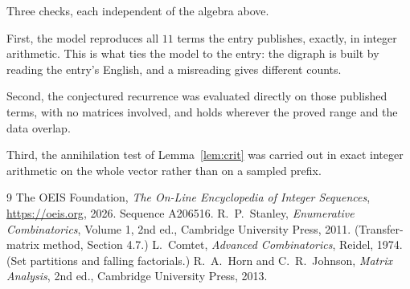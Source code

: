 \documentclass[11pt,a4paper]{article}
\theoremstyle{plain}
\theoremstyle{definition}
\begin{document}
Three checks, each independent of the algebra above.

First, the model reproduces all $11$ terms the entry publishes, exactly, in integer
arithmetic. This is what ties the model to the entry: the digraph is built by reading the
entry's English, and a misreading gives different counts.

Second, the conjectured recurrence was evaluated directly on those published terms, with no
matrices involved, and holds wherever the proved range and the data overlap.

Third, the annihilation test of Lemma~\ref{lem:crit} was carried out in exact integer
arithmetic on the whole vector rather than on a sampled prefix.

\begin{thebibliography}{9}
 The OEIS Foundation, \emph{The On-Line Encyclopedia of Integer
Sequences}, \url{https://oeis.org}, 2026. Sequence A206516.
 R.~P.~Stanley, \emph{Enumerative Combinatorics}, Volume 1, 2nd ed.,
Cambridge University Press, 2011. (Transfer-matrix method, Section 4.7.)
 L.~Comtet, \emph{Advanced Combinatorics}, Reidel, 1974. (Set partitions
and falling factorials.)
 R.~A.~Horn and C.~R.~Johnson, \emph{Matrix Analysis}, 2nd ed., Cambridge
University Press, 2013.
\end{thebibliography}
\end{document}
